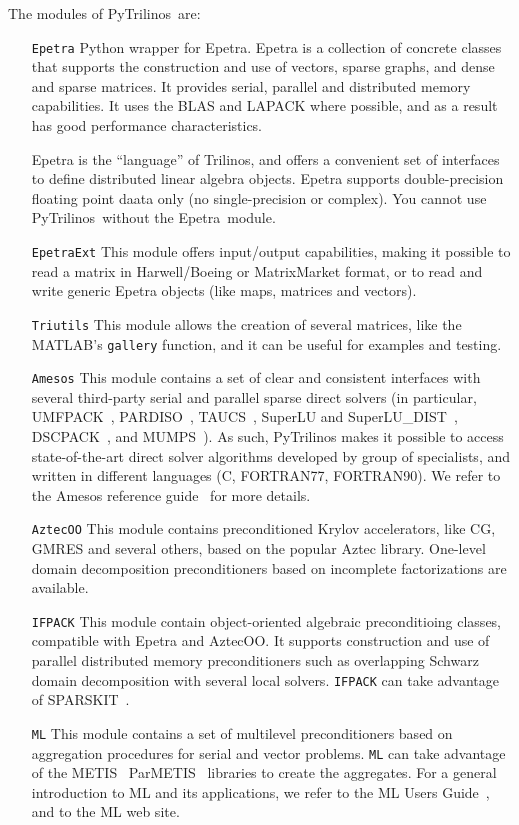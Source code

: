\documentclass[10pt,relax]{SANDreport}
\newcommand{\PyTrilinos}{{PyTrilinos}}
\newcommand{\epetra}{{Epetra}}
\begin{document}
The modules of \PyTrilinos\ are:
\begin{itemize}
\item[\tt Epetra] Python wrapper for Epetra. Epetra is a collection
of concrete classes that supports the construction and use of vectors, sparse
graphs, and dense and sparse matrices. It provides serial, parallel and
distributed memory capabilities. It uses the BLAS and LAPACK where possible,
  and as a result has good performance characteristics.

Epetra is the
``language'' of Trilinos, and offers a convenient set of interfaces to define
distributed linear algebra objects. Epetra supports double-precision floating
point daata only (no single-precision or complex). 
You cannot use \PyTrilinos\ without the \epetra\ module.
%
\item[\tt EpetraExt] This module offers input/output
capabilities, making it possible to read a matrix in Harwell/Boeing or
MatrixMarket format, or to read and write generic Epetra objects 
(like maps, matrices and vectors).
%
\item[\tt Triutils] This module allows the creation of several matrices, 
  like the MATLAB's {\tt gallery} function, and it can be useful for examples
  and testing.
%
\item[\tt Amesos] This module contains a set of clear and consistent
interfaces with several third-party serial and parallel sparse direct solvers
(in particular,
UMFPACK~\cite{umfpack-manual},
PARDISO~\cite{pardiso-manual},
TAUCS~\cite{taucs-manual},
SuperLU and SuperLU\_DIST~\cite{superlu-manual},
DSCPACK~\cite{dscpack-manual}, and 
MUMPS~\cite{mumps-manual}). As such, PyTrilinos makes it possible to access
state-of-the-art direct solver algorithms developed by group of specialists,
  and written in different languages (C, FORTRAN77, FORTRAN90).
We refer to the Amesos reference guide~\cite{Amesos-Reference-Guide} for more details.
%
\item[\tt AztecOO] This module contains preconditioned Krylov accelerators,
  like CG, GMRES and several others, based on the popular Aztec library.
  One-level domain decomposition preconditioners based on incomplete
  factorizations are available.
%
\item[\tt IFPACK] This module contain object-oriented algebraic preconditioing
classes, compatible with Epetra and AztecOO.
It supports construction and use of parallel distributed memory preconditioners
such as overlapping Schwarz domain decomposition with several local solvers.
{\tt IFPACK} can take advantage of SPARSKIT~\cite{sparskit}.
%
\item[\tt ML] This module contains a set of multilevel preconditioners based
on aggregation procedures for serial and vector problems. {\tt ML} can take
advantage of the 
METIS~\cite{metis}
ParMETIS~\cite{parmetis} libraries to create the aggregates.
For a general introduction to ML and its applications, we refer to
the ML Users Guide~\cite{ml-guide}, and to the ML web site.
\end{itemize}
\end{document}
